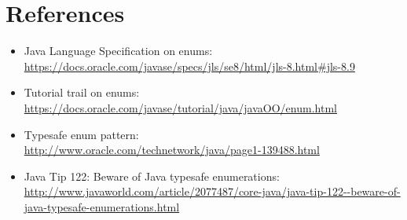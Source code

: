 \section{References\label{fenum-references}}

\begin{itemize}
\item Java Language Specification on enums:\\
  \url{https://docs.oracle.com/javase/specs/jls/se8/html/jls-8.html#jls-8.9}

\item Tutorial trail on enums:\\
  \url{https://docs.oracle.com/javase/tutorial/java/javaOO/enum.html}

\item Typesafe enum pattern:\\
  \url{http://www.oracle.com/technetwork/java/page1-139488.html}

\item Java Tip 122: Beware of Java typesafe enumerations:\\
  \url{http://www.javaworld.com/article/2077487/core-java/java-tip-122--beware-of-java-typesafe-enumerations.html}

\end{itemize}

